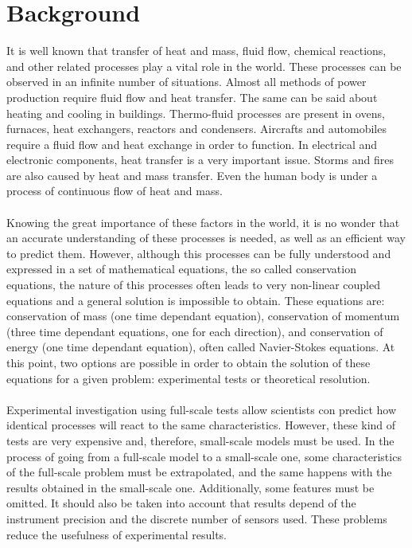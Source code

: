 \section{Background}
It is well known that transfer of heat and mass, fluid flow, chemical reactions, and other related processes play a vital role in the world. These processes can be observed in an infinite number of situations. Almost all methods of power production require fluid flow and heat transfer. The same can be said about heating and cooling in buildings. Thermo-fluid processes are present in ovens, furnaces, heat exchangers, reactors and condensers. Aircrafts and automobiles require a fluid flow and heat exchange in order to function. In electrical and electronic components, heat transfer is a very important issue. Storms and fires are also caused by heat and mass transfer. Even the human body is under a process of continuous flow of heat and mass.\\
\\
Knowing the great importance of these factors in the world, it is no wonder that an accurate understanding of these processes is needed, as well as an efficient way to predict them. However, although this processes can be fully understood and expressed in a set of mathematical equations, the so called conservation equations, the nature of this processes often leads to very non-linear coupled equations and a general solution is impossible to obtain. These equations are: conservation of mass (one time dependant equation), conservation of momentum (three time dependant equations, one for each direction), and conservation of energy (one time dependant equation), often called Navier-Stokes equations. At this point, two options are possible in order to obtain the solution of these equations for a given problem: experimental tests or theoretical resolution.\\
\\
Experimental investigation using full-scale tests allow scientists con predict how identical processes will react to the same characteristics. However, these kind of tests are very expensive and, therefore, small-scale models must be used. In the process of going from a full-scale model to a small-scale one, some characteristics of the full-scale problem must be extrapolated, and the same happens with the results obtained in the small-scale one. Additionally, some features must be omitted. It should also be taken into account that results depend of the instrument precision and the discrete number of sensors used. These problems reduce the usefulness of experimental results.\\
